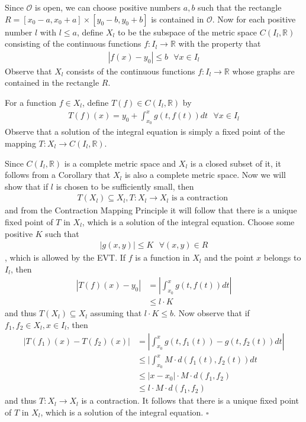 \documentclass{article}
\newcommand*{\qed}{\hfill$\square$}%
\newcommand*{\txt}[1]{\text{ #1 }}%
\newcommand*{\fora}{\txt{}\forall}%
\newcommand*{\rr}{\mathbb{R}}%
\begin{document}
Since $\mathcal{O}$ is open, we can choose positive numbers $a,b$ such that the rectangle $R=[x_0-a,x_0+a]\times[y_0-b,y_0+b]$ is contained in $\mathcal{O}$. Now for each positive number $\mathit{l}$ with $\mathit{l}\leq a$, define $X_\mathit{l}$ to be the subspace of the metric space $C(I_\mathit{l},\rr)$ consisting of the continuous functions $f:I_\mathit{l}\to \rr$ with the property that \begin{align*}
    |f(x)-y_0|\leq b\fora x\in I_\mathit{l}
\end{align*} Observe that $X_\mathit{l}$ consists of the continuous functions $f:I_\mathit{l}\to\rr$ whose graphs are contained in the rectangle $R$. 

For a function $f\in X_\mathit{l}$, define $T(f)\in C(I_\mathit{l},\rr)$ by \begin{align*}
    T(f)(x)=y_0+\int_{x_0}^{x}g(t,f(t))dt\fora x\in I_\mathit{l}
\end{align*} Observe that a solution of the integral equation is simply a fixed point of the mapping $T:X_\mathit{l}\to C(I_\mathit{l},\rr)$.

Since $C(I_\mathit{l},\rr)$ is a complete metric space and $X_\mathit{l}$ is a closed subset of it, it follows from a Corollary that $X_\mathit{l}$ is also a complete metric space. Now we will show that if $\mathit{l}$ is chosen to be sufficiently small, then \begin{align*}
    T(X_\mathit{l})\subseteq X_\mathit{l}, T:X_\mathit{l}\to X_\mathit{l}\txt{is a contraction}
\end{align*} and from the Contraction Mapping Principle it will follow that there is a unique fixed point of $T$ in $X_\mathit{l}$, which is a solution of the integral equation. Choose some positive $K$ such that \begin{align*}
    |g(x,y)|\leq K\fora (x,y)\in R
\end{align*}, which is allowed by the EVT. If $f$ is a function in $X_\mathit{l}$ and the point $x$ belongs to $I_\mathit{l}$, then \begin{align*}
    |T(f)(x)-y_0|&=|\int_{x_0}^{x}g(t,f(t))dt|\\
    &\leq \mathit{l}\cdot K
\end{align*} and thus $T(X_\mathit{l})\subseteq X_\mathit{l}$ assuming that $\mathit{l}\cdot K \leq b$. Now observe that if $f_1,f_2\in X_\mathit{l},x\in I_\mathit{l}$, then \begin{align*}
    |T(f_1)(x)-T(f_2)(x)|&=|\int_{x_0}^{x}g(t,f_1(t))-g(t,f_2(t))dt|\\
    &\leq |\int_{x_0}^{x}M\cdot d(f_1(t),f_2(t))dt\\
    &\leq |x-x_0|\cdot M\cdot d(f_1,f_2)\\
    &\leq \mathit{l}\cdot M\cdot d(f_1,f_2)
\end{align*} and thus $T:X_\mathit{l}\to X_\mathit{l}$ is a contraction. It follows that there is a unique fixed point of $T$ in $X_\mathit{l}$, which is a solution of the integral equation. \qed
\end{document}
